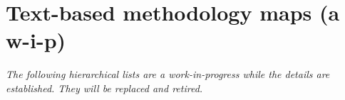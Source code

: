 \section{Text-based methodology maps (a w-i-p)}
\emph{The following hierarchical lists are a work-in-progress while the details are established. They will be replaced and retired.}


